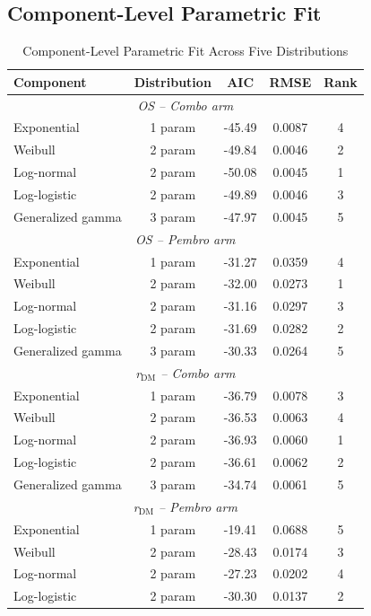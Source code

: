 \documentclass[11pt,a4paper]{article}
\begin{document}
\subsection{Component-Level Parametric Fit}
\label{sec:s3}
\begin{table}[H]
\centering
\caption{Component-Level Parametric Fit Across Five Distributions}
\label{tab:s3}
\begin{tabular*}{\textwidth}{@{\extracolsep{\fill}}lcccc}
\toprule
\textbf{Component} & \textbf{Distribution} & \textbf{AIC} & \textbf{RMSE} & \textbf{Rank} \\
\midrule
\multicolumn{5}{c}{\textit{OS -- Combo arm}} \\
Exponential & 1 param & -45.49 & 0.0087 & 4 \\
Weibull & 2 param & -49.84 & 0.0046 & 2 \\
Log-normal & 2 param & -50.08 & 0.0045 & 1 \\
Log-logistic & 2 param & -49.89 & 0.0046 & 3 \\
Generalized gamma & 3 param & -47.97 & 0.0045 & 5 \\
\midrule
\multicolumn{5}{c}{\textit{OS -- Pembro arm}} \\
Exponential & 1 param & -31.27 & 0.0359 & 4 \\
Weibull & 2 param & -32.00 & 0.0273 & 1 \\
Log-normal & 2 param & -31.16 & 0.0297 & 3 \\
Log-logistic & 2 param & -31.69 & 0.0282 & 2 \\
Generalized gamma & 3 param & -30.33 & 0.0264 & 5 \\
\midrule
\multicolumn{5}{c}{\textit{r$_{\text{DM}}$ -- Combo arm}} \\
Exponential & 1 param & -36.79 & 0.0078 & 3 \\
Weibull & 2 param & -36.53 & 0.0063 & 4 \\
Log-normal & 2 param & -36.93 & 0.0060 & 1 \\
Log-logistic & 2 param & -36.61 & 0.0062 & 2 \\
Generalized gamma & 3 param & -34.74 & 0.0061 & 5 \\
\midrule
\multicolumn{5}{c}{\textit{r$_{\text{DM}}$ -- Pembro arm}} \\
Exponential & 1 param & -19.41 & 0.0688 & 5 \\
Weibull & 2 param & -28.43 & 0.0174 & 3 \\
Log-normal & 2 param & -27.23 & 0.0202 & 4 \\
Log-logistic & 2 param & -30.30 & 0.0137 & 2 \\

\end{tabular*}
\end{table}
\end{document}
